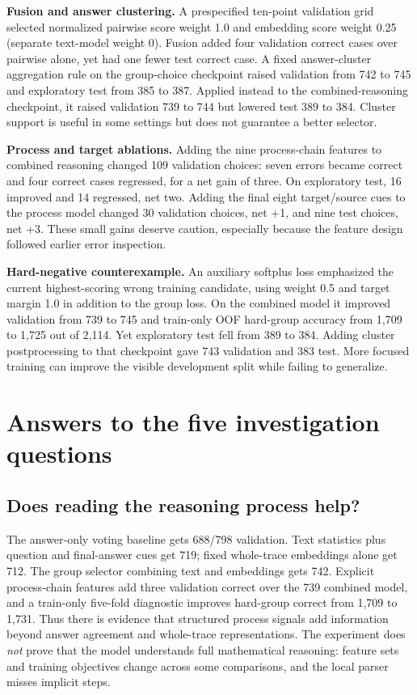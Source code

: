\documentclass[10pt,a4paper]{article}
\begin{document}
\textbf{Fusion and answer clustering.} A prespecified ten-point validation grid selected normalized pairwise score weight 1.0 and embedding score weight 0.25 (separate text-model weight 0). Fusion added four validation correct cases over pairwise alone, yet had one fewer test correct case. A fixed answer-cluster aggregation rule on the group-choice checkpoint raised validation from 742 to 745 and exploratory test from 385 to 387. Applied instead to the combined-reasoning checkpoint, it raised validation 739 to 744 but lowered test 389 to 384. Cluster support is useful in some settings but does not guarantee a better selector.

\textbf{Process and target ablations.} Adding the nine process-chain features to combined reasoning changed 109 validation choices: seven errors became correct and four correct cases regressed, for a net gain of three. On exploratory test, 16 improved and 14 regressed, net two. Adding the final eight target/source cues to the process model changed 30 validation choices, net +1, and nine test choices, net +3. These small gains deserve caution, especially because the feature design followed earlier error inspection.

\textbf{Hard-negative counterexample.} An auxiliary softplus loss emphasized the current highest-scoring wrong training candidate, using weight 0.5 and target margin 1.0 in addition to the group loss. On the combined model it improved validation from 739 to 745 and train-only OOF hard-group accuracy from 1,709 to 1,725 out of 2,114. Yet exploratory test fell from 389 to 384. Adding cluster postprocessing to that checkpoint gave 743 validation and 383 test. More focused training can improve the visible development split while failing to generalize.

\section{Answers to the five investigation questions}
\subsection{Does reading the reasoning process help?}
The answer-only voting baseline gets 688/798 validation. Text statistics plus question and final-answer cues get 719; fixed whole-trace embeddings alone get 712. The group selector combining text and embeddings gets 742. Explicit process-chain features add three validation correct over the 739 combined model, and a train-only five-fold diagnostic improves hard-group correct from 1,709 to 1,731. Thus there is evidence that structured process signals add information beyond answer agreement and whole-trace representations. The experiment does \emph{not} prove that the model understands full mathematical reasoning: feature sets and training objectives change across some comparisons, and the local parser misses implicit steps.
\end{document}
